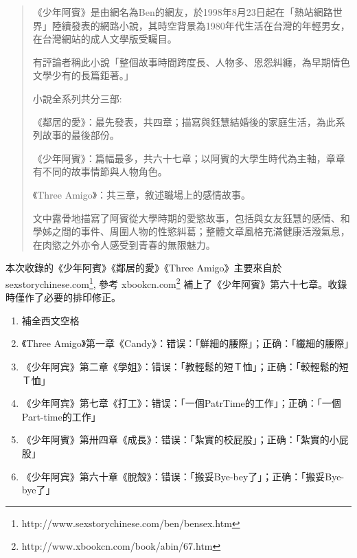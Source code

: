 
\begin{quotation}
    《少年阿賓》是由網名為Ben的網友，於1998年8月23日起在「熱站網路世界」陸續發表的網路小說，其時空背景為1980年代生活在台灣的年輕男女，在台灣網站的成人文學版受矚目。

有評論者稱此小說「整個故事時間跨度長、人物多、恩怨糾纏，為早期情色文學少有的長篇鉅著。」

小說全系列共分三部:

《鄰居的愛》：最先發表，共四章；描寫與鈺慧結婚後的家庭生活，為此系列故事的最後部份。

《少年阿賓》：篇幅最多，共六十七章；以阿賓的大學生時代為主軸，章章有不同的故事情節與人物角色。

《Three Amigo》：共三章，敘述職場上的感情故事。

文中露骨地描寫了阿賓從大學時期的愛慾故事，包括與女友鈺慧的感情、和學姊之間的事件、周圍人物的性慾糾葛；整體文章風格充滿健康活潑氣息，在肉慾之外亦令人感受到青春的無限魅力。

\end{quotation}

本次收錄的《少年阿賓》《鄰居的愛》《Three Amigo》主要來自於sexstorychinese.com\footnote{http://www.sexstorychinese.com/ben/bensex.htm}, 參考 xbookcn.com\footnote{http://www.xbookcn.com/book/abin/67.htm} 補上了《少年阿賓》第六十七章。收錄時僅作了必要的排印修正。

\begin{enumerate}
\item 補全西文空格
\item 《Three Amigo》第一章《Candy》：错误：「鮮細的腰際」；正确：「纖細的腰際」
\item 《少年阿宾》第二章《學姐》：错误：「教輕鬆的短Ｔ恤」；正确：「較輕鬆的短Ｔ恤」
\item 《少年阿宾》第七章《打工》：错误：「一個PatrTime的工作」；正确：「一個Part-time的工作」
\item 《少年阿賓》第卅四章《成長》：错误：「紮實的校屁股」；正确：「紮實的小屁股」
\item 《少年阿宾》第六十章《脫殼》：错误：「搬妥Bye-bey了」；正确：「搬妥Bye-bye了」
\end{enumerate}
